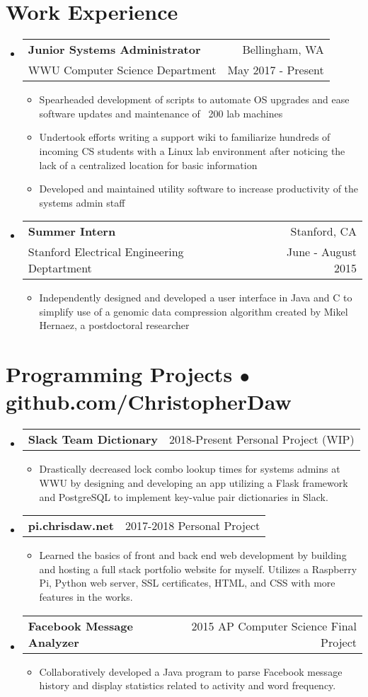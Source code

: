 \documentclass[12pt, letterpaper]{article}
\makeatletter
\newcommand{\resumeItem}[1]{
  \item[$\bullet$]{
    #1 \vspace{-2pt}
  }
}
\newcommand{\resumeSubsection}[4]{
  \item[]
    \begin{tabular*}{0.97\textwidth}{@{\extracolsep{\fill}} l r}
      \textbf{#1} & #2 \vspace{1pt} \\
      #3 & #4 \\
    \end{tabular*}
}
\newcommand{\resumeProject}[3]{
  \item[]
    \begin{tabular*}{0.97\textwidth}{@{\extracolsep{\fill}} l r}
      \textbf{#1} & #2 \\
    \end{tabular*}\vspace{-10pt}
    \begin{itemize}
        \item[] #3
    \end{itemize}
}
\makeatother
\begin{document}
\section{Work Experience}
  \begin{itemize}[leftmargin=*]
    \resumeSubsection
      {Junior Systems Administrator}{Bellingham, WA}
      {WWU Computer Science Department}{May 2017 - Present}
      \begin{itemize}
        \resumeItem{
          Spearheaded development of scripts to automate OS upgrades and ease software updates and maintenance of ~200 lab machines}
        \resumeItem{
            Undertook efforts writing a support wiki to familiarize hundreds of incoming CS students with a Linux lab environment after noticing the lack of a centralized location for basic information}
        \resumeItem{
            Developed and maintained utility software to increase productivity of the systems admin staff}
      \end{itemize}

    \resumeSubsection
      {Summer Intern}{Stanford, CA}
      {Stanford Electrical Engineering Deptartment}{June - August 2015}
      \begin{itemize}
        \resumeItem{
            Independently designed and developed a user interface in Java and C to simplify use of a genomic data compression algorithm created by Mikel Hernaez, a postdoctoral researcher}
      \end{itemize}
    \end{itemize}

\vspace{-15pt}

\section{Programming Projects $\bullet$ github.com/ChristopherDaw}
  \begin{itemize}[leftmargin=*]
    \resumeProject
      {Slack Team Dictionary}{2018-Present Personal Project (WIP)}
      {Drastically decreased lock combo lookup times for systems admins at WWU by designing and developing an app utilizing a Flask framework and PostgreSQL to implement key-value pair dictionaries in Slack.}
  \resumeProject
      {pi.chrisdaw.net}{2017-2018 Personal Project}
      {Learned the basics of front and back end web development by building and hosting a full stack portfolio website for myself. Utilizes a Raspberry Pi, Python web server, SSL certificates, HTML, and CSS with more features in the works.}
  \resumeProject
      {Facebook Message Analyzer}{2015 AP Computer Science Final Project}
      {Collaboratively developed a Java program to parse Facebook message history and display statistics related to activity and word frequency.}
  \end{itemize}%
\end{document}
